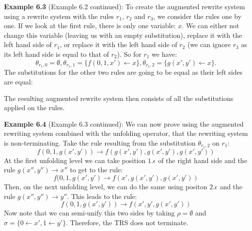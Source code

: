 \textbf{Example 6.3} (Example 6.2 continued): To create the augmented rewrite system using a rewrite system with the rules $r_1$, $r_2$ and $r_3$, we consider the rules one by one. If we look at the first rule, there is only one variable: $x$. We can either not change this variable (leaving us with an empty substitution), replace it with the left hand side of $r_1$, or replace it with the left hand side of $r_2$ (we can ignore $r_3$ as its left hand side is equal to that of $r_2$). So for $r_1$ we have:
$$ \theta_{r_1,0} = \emptyset, \theta_{r_1,1} = \{ f(0, 1, x') \leftarrow x \}, \theta_{r_1,2} = \{ g(x', y') \leftarrow x \}\text{.}$$
The substitutions for the other two rules are going to be equal as their left sides are equal:
\begin{center}
\end{center}
The resulting augmented rewrite system then consists of all the substitutions applied on the rules.

\textbf{Example 6.4} (Example 6.3 continued): We can now prove using the augmented rewriting system combined with the unfolding operator, that the rewriting system is non-terminating. Take the rule resulting from the substitution $\theta_{r_1, 2}$ on $r_1$: 
$$f(0, 1, g(x', y')) \rightarrow f(g(x', y'), g(x', y'), g(x', y'))$$
At the first unfolding level we can take position $1.\epsilon$ of the right hand side and the rule $g(x'', y'') \rightarrow x''$ to get to the rule:
$$f(0, 1, g(x', y') \rightarrow f(x', g(x', y'), g(x', y'))$$ 
Then, on the next unfolding level, we can do the same using positon $2.\epsilon$ and the rule $g(x'', y'') \rightarrow y''$. This leads to the rule:
$$f(0, 1, g(x', y')) \rightarrow f(x', y', g(x', y'))$$
Now note that we can semi-unify this two sides by taking $\rho = \emptyset$ and $\sigma = \{ 0 \leftarrow x', 1 \leftarrow y' \}$. Therefore, the TRS does not terminate.

